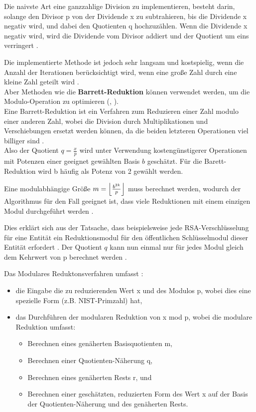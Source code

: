 Die naivste Art eine ganzzahlige Division zu implementieren, besteht darin,
solange den Divisor p von der Dividende x zu subtrahieren, bis die Dividende x negativ wird, und dabei den Quotienten q hochzuzählen. Wenn die Dividende x negativ wird, wird
die Dividende vom Divisor addiert und der Quotient um eins verringert \cite{bericht}. 

Die implementierte Methode ist jedoch sehr langsam und kostspielig, wenn die Anzahl der Iterationen berücksichtigt wird, wenn eine große Zahl durch eine kleine Zahl geteilt wird 
\cite{barett}. \\

Aber Methoden wie die \textbf{Barrett-Reduktion} können verwendet werden, um die Modulo-Operation zu optimieren (\cite{anoops}, \cite{hasenplaugh}).\\

Eine Barrett-Reduktion ist ein Verfahren zum Reduzieren einer Zahl modulo einer anderen Zahl, wobei die Division durch Multiplikationen und Verschiebungen ersetzt werden können, da die beiden letzteren Operationen viel billiger sind \cite{patent}.\\
Also der Quotient  $ q = \frac{x}{p} $ wird unter Verwendung kostengünstigerer Operationen mit Potenzen einer geeignet gewählten Basis $ b $ geschätzt. Für die Barett-Reduktion wird b häufig als Potenz von 2 gewählt werden.

Eine modulabhängige Größe $ m = \floor*{\frac{b^{2k}}{p}} $ muss berechnet werden, wodurch der Algorithmus für den Fall geeignet ist, dass viele Reduktionen mit einem einzigen Modul durchgeführt werden \cite{Hankerson}. 

Dies erklärt sich aus der Tatsache, dass beispielsweise jede RSA-Verschlüsselung für eine Entität ein Reduktionsmodul für den öffentlichen Schlüsselmodul dieser Entität erfordert \cite{menezes:1997}. Der Quotient $ q $ kann nun einmal nur für jedes Modul gleich dem Kehrwert von p berechnet werden \cite{barett}.

Das Modulares Reduktonsverfahren umfasst \cite{patent}:
\begin{itemize}
       \item die Eingabe die zu reduzierenden Wert x und des Modulos p, wobei dies eine spezielle Form (z.B. NIST-Primzahl) hat,
       \item das Durchführen der modularen Reduktion von x mod p, wobei die modulare Reduktion umfasst:
       \begin{itemize}
         \item Berechnen eines genäherten Basisquotienten m,
         \item Berechnen einer Quotienten-Näherung q, 
         \item Berechnen eines genäherten Rests r, und
         \item Berechnen einer geschätzten, reduzierten Form des Wert x auf der Basis der Quotienten-Näherung und des genäherten Rests.
       \end{itemize}
\end{itemize}

